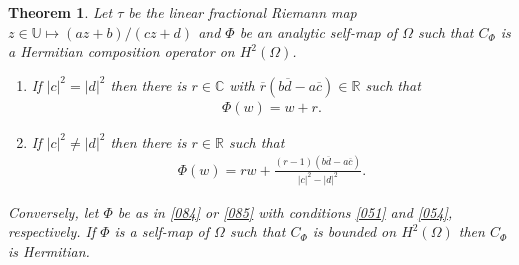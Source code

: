 \documentclass[11pt]{amsart}%
\newtheorem{thm}{Theorem}[section]
\theoremstyle{definition}
\theoremstyle{remark}
\numberwithin{equation}{section}
\begin{document}
\begin{thm}
\label{059} Let $\tau$ be the linear fractional Riemann map $z\in \mathbb{U} \mapsto (az+b)/(cz+d)$ and $\Phi$ be an analytic self-map of $\Omega$ such that
$C_{\Phi}$ is a Hermitian composition operator on $H^{2}(\Omega)$.

\begin{enumerate}
\item \label{051} If $|c|^{2}=|d|^{2}$ then there is $r\in\mathbb{C}$ with
$\overline{r}(b\overline{d}-a\overline{c})\in\mathbb{R}$ such that
\begin{align}
\label{084}\Phi(w)=w+r.
\end{align}


\item \label{054} If $|c|^{2}\neq|d|^{2}$ then there is $r\in\mathbb{R}$ such
that
\begin{align}
\label{085}\Phi(w)=rw+\frac{(r-1)(b\overline{d}-a\overline{c})}{|c|^{2}%
-|d|^{2}}.
\end{align}

\end{enumerate}

Conversely, let $\Phi$ be as in \eqref{084} or \eqref{085} with conditions
\eqref{051} and \eqref{054}, respectively. If $\Phi$ is a self-map
of $\Omega$ such that $C_{\Phi}$ is bounded on $H^{2}(\Omega)$ then $C_{\Phi}$
is Hermitian.
\end{thm}
\end{document}
